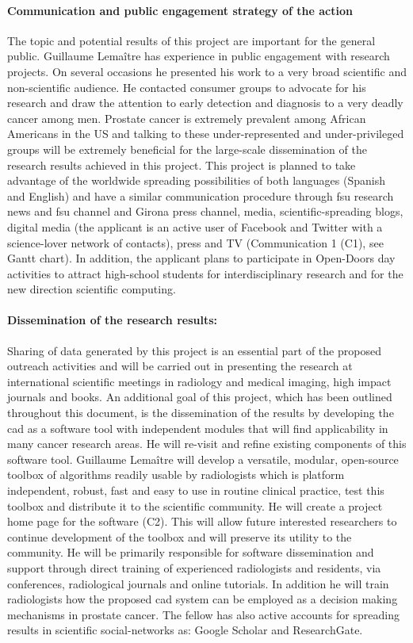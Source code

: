 \paragraph{Communication and public engagement strategy of the action}
The topic and potential results of this project are important for the general public.
Guillaume Lema\^itre has experience in public engagement with research projects.
On several occasions he presented his work to a very broad scientific and non-scientific audience.
He contacted consumer groups to advocate for his research and draw the attention to early detection and diagnosis to a very deadly cancer among men.
Prostate cancer is extremely prevalent among African Americans in the US and talking to these under-represented and under-privileged groups will be extremely beneficial for the large-scale dissemination of the research results achieved in this project.
This project is planned to take advantage of the worldwide spreading possibilities of both languages (Spanish and English) and have a similar communication procedure through \ac{fsu} research news and \ac{fsu} channel and Girona press channel, media, scientific-spreading blogs, digital media (the applicant is an active user of Facebook and Twitter with a science-lover network of contacts), press and TV (Communication 1 (C1), see Gantt chart).
In addition, the applicant plans to participate in Open-Doors day activities to attract high-school students for interdisciplinary research and for the new direction scientific computing.

\paragraph{Dissemination of the research results:}
Sharing of data generated by this project is an essential part of the proposed outreach activities and will be carried out in presenting the research at international scientific meetings in radiology and medical imaging, high impact journals and books.
An additional goal of this project, which has been outlined throughout this document, is the dissemination of the results by developing the \ac{cad} as a software tool with independent modules that will find applicability in many cancer research areas.
He will re-visit and refine existing components of this software tool.
Guillaume Lema\^itre  will develop a versatile, modular, open-source toolbox of algorithms readily usable by radiologists which is platform independent, robust, fast and easy to use in routine clinical practice, test this toolbox and distribute it to the scientific community.
He will create a project home page for the software (C2).
This will allow future interested researchers to continue development of the toolbox and will preserve its utility to the community.
He will be primarily responsible for software dissemination and support through direct training of experienced radiologists and residents, via conferences, radiological journals and online tutorials.
In addition he will train radiologists how the proposed \ac{cad} system can be employed as a decision making mechanisms in prostate cancer.
The fellow has also active accounts for spreading results in scientific social-networks as: Google Scholar and ResearchGate.

